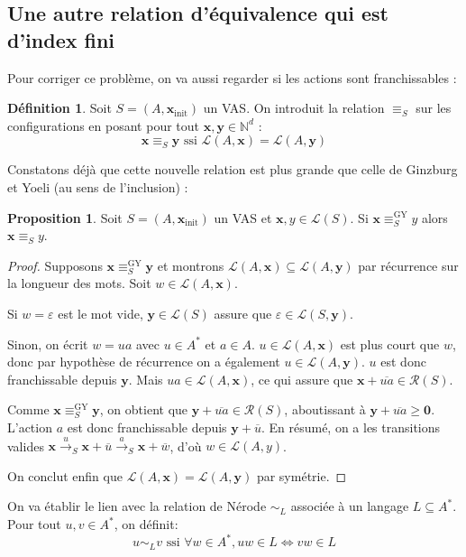 \documentclass[a4paper,final]{article}
\theoremstyle{definition}
\newtheorem{Definition}[Theorem]{Définition}
\newtheorem{Proposition}[Theorem]{Proposition}
\let\epsilon\varepsilon
\let\geq\geqslant
\newcommand{\N}{\ensuremath{\mathbb{N}}}
\newcommand{\lang}{\ensuremath{\mathcal{L}}}
\newcommand{\conf}{\ensuremath{\mathcal{R}}}
\newcommand{\trans}[2]{\ensuremath{\stackrel{#1}{\longrightarrow}_{#2}}}
\newcommand{\vect}[1]{\ensuremath{\mathbf{#1}}}
\newcommand{\rel}{\ensuremath{\equiv}}
\newcommand{\relGY}{\ensuremath{\equiv^\text{GY}_S}}
\newcommand{\ssi}{\ensuremath{\text{ ssi }}}
\newcommand{\equivaut}{\ensuremath{\Leftrightarrow}}
\newcommand{\xinit}{\ensuremath{\vect{x}_\text{init}}}
\newcommand{\valeur}[1]{\ensuremath{\overline{#1}}}
\begin{document}
\subsection{Une autre relation d'équivalence qui est d'index fini}
Pour corriger ce problème, on va aussi regarder si les actions sont franchissables :

\begin{Definition}
Soit $S=(A,\xinit)$ un VAS. On introduit la relation $\rel_S$ sur les configurations en posant pour tout $\vect{x},\vect{y} \in\N^d$ :
$$\vect{x} \rel_S \vect{y} \ssi \lang(A,\vect{x}) = \lang(A,\vect{y})$$
\end{Definition}


Constatons déjà que cette nouvelle relation est plus grande que celle de Ginzburg et Yoeli (au sens de l'inclusion) :

\begin{Proposition}
Soit $S=(A,\xinit)$ un VAS et $\vect{x},y \in\lang(S)$.
Si $\vect{x} \relGY y$ alors $\vect{x} \rel_S y$.
\end{Proposition}

\begin{proof}
Supposons $\vect{x} \relGY \vect{y}$ et montrons $\lang(A,\vect{x}) \subseteq \lang(A,\vect{y})$ par récurrence sur la longueur des mots.
Soit $w\in\lang(A,\vect{x})$.

Si $w=\epsilon$ est le mot vide, $\vect{y} \in\lang(S)$ assure que $\epsilon\in\lang(S,\vect{y})$.

Sinon, on écrit $w=ua$ avec $u\in A^\ast$ et $a\in A$.
$u\in\lang(A,\vect{x})$ est plus court que $w$, donc par hypothèse de récurrence on a également $u\in\lang(A,\vect{y})$.
$u$ est donc franchissable depuis $\vect{y}$.
Mais $ua\in\lang(A,\vect{x})$, ce qui assure que $\vect{x} +\valeur{ua}\in\conf(S)$.

Comme $\vect{x} \relGY \vect{y}$, on obtient que $\vect{y} +\valeur{ua} \in\conf(S)$, aboutissant à $\vect{y} +\valeur{ua} \geq\vect{0}$.
L'action $a$ est donc franchissable depuis $\vect{y} +\valeur{u}$.
En résumé, on a les transitions valides $\vect{x} \trans{u}{S} \vect{x} +\valeur{u} \trans{a}{S} \vect{x} +\valeur{w}$, d'où $w\in\lang(A,y)$.

On conclut enfin que $\lang(A,\vect{x}) = \lang(A,\vect{y})$ par symétrie.
\end{proof}

On va établir le lien avec la relation de Nérode $\sim_L$ associée à un langage $L \subseteq A^*$. 
Pour tout $u,v\in A^\ast$, on définit: 
$$ u\sim_L v \ssi \forall w\in A^\ast, uw\in L \equivaut vw\in L $$
\end{document}
